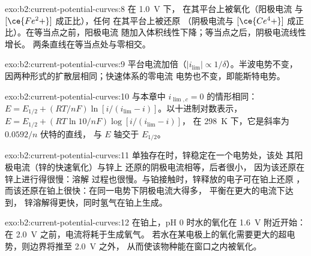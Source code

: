 \begin{solution}{exo:b2:current-potential-curves:8}
在 \qty{1.0}{V} 下， 在其平台上被氧化（阳极电流
与 $[\ce{Fe^2+}]$ 成正比），任何  在其平台上被还原
（阴极电流与 $[\ce{Ce^4+}]$ 成正比）。在等当点之前，阳极电流
随加入体积线性下降；等当点之后，阴极电流线性增长。
两条直线在等当点处与零相交。
\end{solution}

\begin{solution}{exo:b2:current-potential-curves:9}
平台电流加倍（$|i_{\lim}| \propto 1/\delta$）。半波电势不变，
因两种形式的扩散层相同；快速体系的零电流
电势也不变，即能斯特电势。
\end{solution}

\begin{solution}{exo:b2:current-potential-curves:10}
与本章中 $i_{\lim,c} = 0$ 的情形相同：$E = E_{1/2} + (RT/nF)\ln[i/(i_{\lim} -
i)]$。以十进制对数表示，$E = E_{1/2} + (RT\ln 10/nF)\log[i/(i_{\lim} - i)]$，
在 \qty{298}{K} 下，它是斜率为 $0.0592/n$ 伏特的直线，
与 $E$ 轴交于 $E_{1/2}$。
\end{solution}

\begin{solution}{exo:b2:current-potential-curves:11}
单独存在时，锌稳定在一个电势处，该处
其阳极电流（锌的快速氧化）与锌上  还原的阴极电流相等，后者很小，
因为该还原在锌上进行得很慢：溶解
过程也很慢。与铂接触时，锌释放的电子可在铂上还原 ，
而该还原在铂上很快：在同一电势下阴极电流大得多，
平衡在更大的电流下达到，
锌溶解得更快，同时氢气在铂上生成。
\end{solution}

\begin{solution}{exo:b2:current-potential-curves:12}
在铂上，pH 0 时水的氧化在 \qty{1.6}{V} 附近开始：
在 \qty{2.0}{V} 之前，电流将耗于生成氧气。
若水在某电极上的氧化需要更大的超电势，则边界将推至 \qty{2.0}{V} 之外，
从而使该物种能在窗口之内被氧化。
\end{solution}

